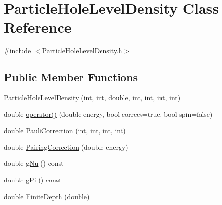 \hypertarget{classParticleHoleLevelDensity}{\section{Particle\-Hole\-Level\-Density Class Reference}
\label{classParticleHoleLevelDensity}
}


{\ttfamily \#include $<$Particle\-Hole\-Level\-Density.\-h$>$}

\subsection*{Public Member Functions}
\begin{DoxyCompactItemize}
\item 
\hyperlink{classParticleHoleLevelDensity_a47725bc4322c23076475bc4f729c4993}{Particle\-Hole\-Level\-Density} (int, int, double, int, int, int, int)
\item 
double \hyperlink{classParticleHoleLevelDensity_a9529125c1d9a033b46ceab05259cfa26}{operator()} (double energy, bool correct=true, bool spin=false)
\item 
double \hyperlink{classParticleHoleLevelDensity_a7b3aa8776f1913453389e6fd6172e216}{Pauli\-Correction} (int, int, int, int)
\item 
double \hyperlink{classParticleHoleLevelDensity_ac9719244be6c45a25b5dfe208c363bbd}{Pairing\-Correction} (double energy)
\item 
double \hyperlink{classParticleHoleLevelDensity_af990f31da2a0bab282762bffea976586}{g\-Nu} () const 
\item 
double \hyperlink{classParticleHoleLevelDensity_a2f46edfdc4a2c8257dd6a2ca5ef573b1}{g\-Pi} () const 
\item 
double \hyperlink{classParticleHoleLevelDensity_a162ffe8a3e56cca1c3ffc6bc13f45254}{Finite\-Depth} (double)
\end{DoxyCompactItemize}


